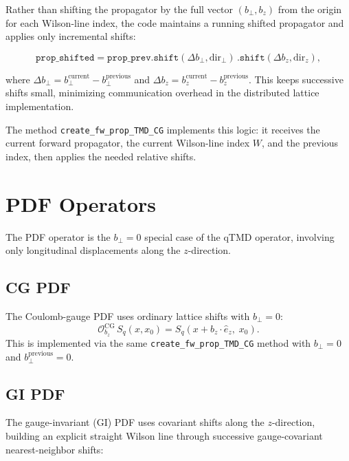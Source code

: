 \documentclass[11pt,a4paper]{article}
\newcommand{\ehat}[1]{\hat{e}_{#1}}
\begin{document}
Rather than shifting the propagator by the full vector $(b_\perp, b_z)$ from the
origin for each Wilson-line index, the code maintains a running shifted propagator
and applies only incremental shifts:

\begin{equation}
  \texttt{prop\_shifted} =
    \texttt{prop\_prev.shift}(\Delta b_\perp, \text{dir}_\perp)\,
    \texttt{.shift}(\Delta b_z, \text{dir}_z),
\end{equation}

where $\Delta b_\perp = b_\perp^{\text{current}} - b_\perp^{\text{previous}}$ and
$\Delta b_z = b_z^{\text{current}} - b_z^{\text{previous}}$. This keeps successive
shifts small, minimizing communication overhead in the distributed lattice
implementation.

The method \texttt{create\_fw\_prop\_TMD\_CG} implements this logic: it receives the
current forward propagator, the current Wilson-line index $W$, and the previous
index, then applies the needed relative shifts.

\section{PDF Operators}
\label{sec:pdf}

The PDF operator is the $b_\perp = 0$ special case of the qTMD operator, involving
only longitudinal displacements along the $z$-direction.

\subsection{CG PDF}

The Coulomb-gauge PDF uses ordinary lattice shifts with $b_\perp = 0$:
\begin{equation}
  \mathcal{O}_{b_z}^{\text{CG}}\, S_q(x, x_0) =
    S_q(x + b_z \cdot \ehat{z},\; x_0).
\end{equation}
This is implemented via the same \texttt{create\_fw\_prop\_TMD\_CG} method with
$b_\perp = 0$ and $b_\perp^{\text{previous}} = 0$.

\subsection{GI PDF}

The gauge-invariant (GI) PDF uses covariant shifts along the $z$-direction, building
an explicit straight Wilson line through successive gauge-covariant nearest-neighbor
shifts:
\end{document}
